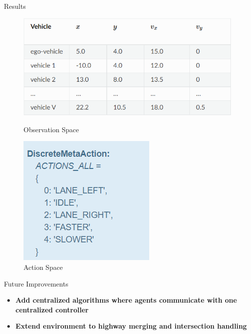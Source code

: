 \documentclass[final]{beamer}
\newlength{\onecolwid}
\begin{document}
\begin{frame}[t]
\begin{columns}[t]
\begin{column}{\onecolwid}
\begin{block}{Results}
    \begin{figure}[!tbp]
        \vspace*{0.2cm}
        \centering
        \begin{minipage}[b]{0.5\textwidth}
          \includegraphics[width=\textwidth]{images/observation_space.png}
          \caption{Observation Space}
        \end{minipage}
        \hfill
        \begin{minipage}[b]{0.26\textwidth}
          \includegraphics[width=\textwidth]{images/action_space.png}
          \caption{Action Space}
        \end{minipage}
      \end{figure}
\end{block} 

\begin{block}{Future Improvements}
    \begin{itemize}
      \item \textbf{Add centralized algorithms where agents communicate with one centralized controller}
      \item \textbf{Extend environment to highway merging and intersection handling}
    \end{itemize}
\end{block} 


\end{column}
\end{columns}
\end{frame}
\end{document}
